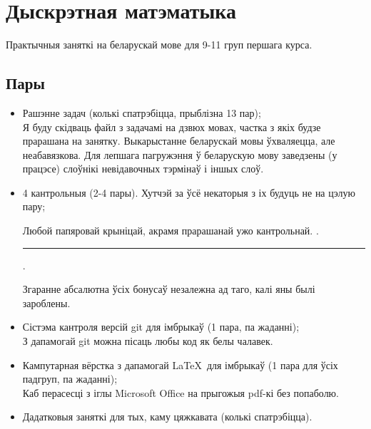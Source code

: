 


	\section{Дыскрэтная матэматыка}
	Практычныя заняткі на беларускай мове для 9-11 груп першага курса.
	
	\subsection{Пары}
	\begin{itemize}
		\item Рашэнне задач (колькі спатрэбіцца, прыблізна 13 пар); \\[6pt]
		{Я буду скідваць файл з задачамі на дзвюх мовах, частка з якіх будзе прарашана на занятку. Выкарыстанне беларускай мовы ўхваляецца, але неабавязкова. Для лепшага пагружэння ў беларускую мову заведзены (у працэсе) слоўнікі невідавочных тэрмінаў і іншых слоў.}
		\item 4 кантрольныя (2-4 пары). Хутчэй за ўсё некаторыя з іх будуць не на цэлую пару; \\[6pt]
		{Любой папяровай крыніцай, акрамя прарашанай ужо кантрольнай. .\noindent\rule{0.5cm}{0.4pt}. \\[6pt]}
		{Згаранне абсалютна ўсіх бонусаў незалежна ад таго, калі яны былі зароблены.}
		\item Сістэма кантроля версій git для імбрыкаў (1 пара, па жаданні); \\[6pt]
		{З дапамогай git можна пісаць любы код як белы чалавек.}
		\item Кампутарная вёрстка з дапамогай \LaTeX~для імбрыкаў (1 пара для ўсіх падгруп, па жаданні); \\[6pt]
		{Каб перасесці з іглы Microsoft Office на прыгожыя pdf-кі без попаболю.}
		\item Дадатковыя заняткі для тых, каму цяжкавата (колькі спатрэбіцца).
	\end{itemize}

